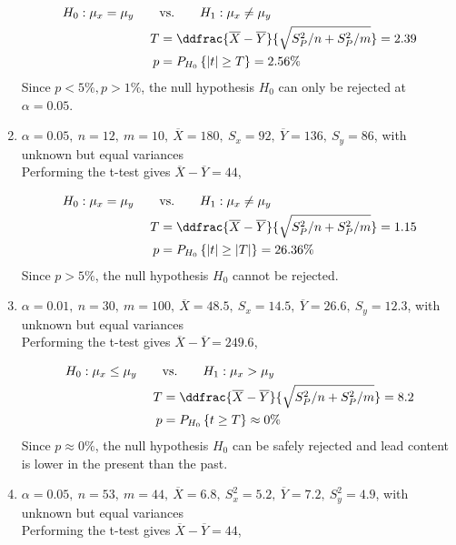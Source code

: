 \begin{enumerate}
	\begin{align}
		H_0 : \mu_x = \mu_y \qquad &\text{vs.} \qquad H_1 : \mu_x \neq \mu_y \nonumber \\
		T &= \ddfrac{ \overline{X} - \overline{Y} }{\sqrt{S_P^2/n + S_P^2/m}} = 2.39 \nonumber \\
		p &= P_{H_0}\left\{|t| \geq T\right\} = 2.56\% 
	\end{align}
	Since $ p < 5\%, p > 1\% $, the null hypothesis $ H_0 $ can only be rejected at $ \alpha = 0.05 $.
	
	
	\item $\alpha = 0.05,\ n = 12,\ m = 10,\ \overline{X} = 180,\ S_x = 92,\ \overline{Y} = 136,\ S_y = 86$, with unknown but equal variances\\
	Performing the t-test gives $ \overline{X} - \overline{Y} = 44 $,
	
	\begin{align}
		H_0 : \mu_x = \mu_y \qquad &\text{vs.} \qquad H_1 : \mu_x \neq \mu_y \nonumber \\
		T &= \ddfrac{ \overline{X} - \overline{Y} }{\sqrt{S_P^2/n + S_P^2/m}} = 1.15 \nonumber \\
		p &= P_{H_0}\left\{|t| \geq |T|\right\} = 26.36\% 
	\end{align}
	Since $ p > 5\% $, the null hypothesis $ H_0 $ cannot be rejected.
	
	\item $\alpha = 0.01,\ n = 30,\ m = 100,\ \overline{X} = 48.5,\ S_x = 14.5,\ \overline{Y} = 26.6,\ S_y = 12.3$, with unknown but equal variances\\
	Performing the t-test gives $ \overline{X} - \overline{Y} = 249.6 $,
	
	\begin{align}
		H_0 : \mu_x \leq \mu_y \qquad &\text{vs.} \qquad H_1 : \mu_x > \mu_y \nonumber \\
		T &= \ddfrac{ \overline{X} - \overline{Y} }{\sqrt{S_P^2/n + S_P^2/m}} = 8.2 \nonumber \\
		p &= P_{H_0}\left\{t \geq T\right\} \approx 0\% 
	\end{align}
	Since $ p \approx 0\% $, the null hypothesis $ H_0 $ can be safely rejected and lead content is lower in the present than the past.
	
	\item $\alpha = 0.05,\ n = 53,\ m = 44,\ \overline{X} = 6.8,\ S_x^2 = 5.2,\ \overline{Y} = 7.2,\ S_y^2 = 4.9$, with unknown but equal variances\\
	Performing the t-test gives $ \overline{X} - \overline{Y} = 44 $,
	

\end{enumerate}
